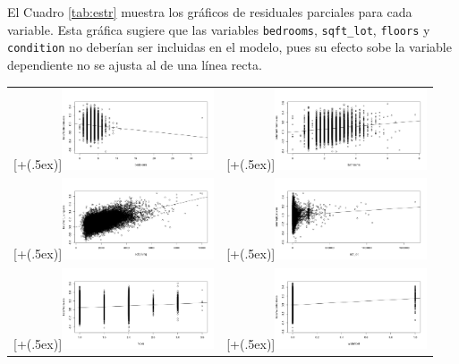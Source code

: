 \documentclass[10pt,letterpaper]{article}
\newcommand*{\addheight}[2][.5ex]{%
	\raisebox{0pt}[\dimexpr\height+(#1)\relax]{#2}%
}
\begin{document}
El Cuadro \ref{tab:estr} muestra los gráficos de residuales parciales para cada variable. Esta gráfica sugiere que las variables \texttt{bedrooms}, \texttt{sqft\_lot}, \texttt{floors} y \texttt{condition} no deberían ser incluidas en el modelo, pues su efecto sobe la variable dependiente no se ajusta al de una línea recta.

\newpage
\begin{table}%
	\centering
	\begin{tabular}{cc}
		\addheight{\includegraphics[width=45mm]{pr1.png}} &
		\addheight{\includegraphics[width=45mm]{pr2.png}} \\
		\addheight{\includegraphics[width=45mm]{pr3.png}} &
		\addheight{\includegraphics[width=45mm]{pr4.png}} \\
		\addheight{\includegraphics[width=45mm]{pr5.png}} &
		\addheight{\includegraphics[width=45mm]{pr6.png}} \\

\end{tabular}
\end{table}
\end{document}
